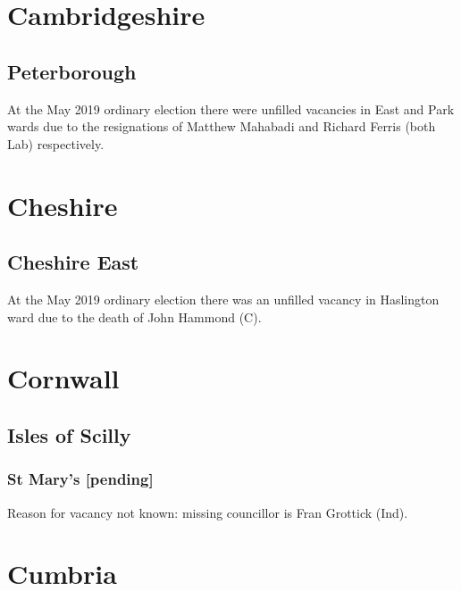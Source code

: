 \documentclass[a4paper,openany]{book}
\begin{document}
\begin{resultsiii}
\section{Cambridgeshire}

\subsection*{Peterborough}

At the May 2019 ordinary election there were unfilled vacancies in East and Park wards due to the resignations of Matthew Mahabadi and Richard Ferris (both Lab) respectively.

\section{Cheshire}

\subsection*{Cheshire East}

At the May 2019 ordinary election there was an unfilled vacancy in Haslington ward due to the death of John Hammond (C).

\section{Cornwall}

\subsection*{Isles of Scilly}

\subsubsection*{St Mary's \hspace*{\fill}\nolinebreak[1]%
	\enspace\hspace*{\fill}
	[pending]}


Reason for vacancy not known: missing councillor is Fran Grottick (Ind).

\section{Cumbria}


\end{resultsiii}
\end{document}
